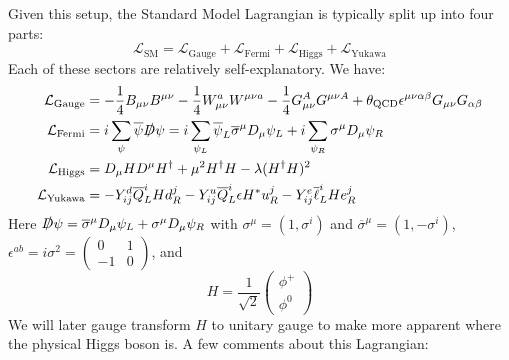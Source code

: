 \documentclass[11pt, oneside]{article}   	%
\theoremstyle{definition}
\numberwithin{equation}{subsection}		%
\begin{document}
Given this setup, the Standard Model Lagrangian is typically split up into four parts:
\begin{equation}
	\mathcal L_\mathrm{SM} = \mathcal{L}_\mathrm{Gauge} + \mathcal{L}_\mathrm{Fermi} + \mathcal{L}_\mathrm{Higgs} + 
	\mathcal{L}_\mathrm{Yukawa}
\end{equation}
Each of these sectors are relatively self-explanatory. We have:
\begin{align}
	\mathcal{L}_\mathrm{Gauge} &= -\frac{1}{4} B_{\mu\nu} B^{\mu\nu} - \frac{1}{4} W_{\mu\nu}^a W^{\mu\nu a} - \frac{1}{4} 
	G_{\mu\nu}^A G^{\mu\nu A} + \theta_\mathrm{QCD} \epsilon^{\mu\nu\alpha\beta} G_{\mu\nu} G_{\alpha\beta} \\
	\mathcal{L}_\mathrm{Fermi} &= i\sum_\psi\overline\psi \slashed D \psi = i\sum_{\psi_L} \overline\psi_L 
	\overline\sigma^\mu D_\mu\psi_L + i\sum_{\psi_R} \sigma^\mu D_\mu \psi_R \\
	\mathcal{L}_\mathrm{Higgs} &= D_\mu H D^\mu H^\dagger + \mu^2 H^\dagger H - \lambda (H^\dagger H)^2 \\
	\mathcal{L}_\mathrm{Yukawa} &= - Y_{ij}^d \overline Q_L^i H d_R^j - Y_{ij}^u \overline Q_L^i\epsilon H^* u_R^j - 
	Y_{ij}^e \overline\ell_L^i H e_R^j~\label{eq:yukawa}
\end{align}
Here $\slashed D\psi = \overline\sigma^\mu D_\mu \psi_L + \sigma^\mu D_\mu \psi_R$ with $\sigma^\mu = (1, 
\sigma^i)$ and $\overline\sigma^\mu = (1, -\sigma^i)$, $\epsilon^{ab} = i\sigma^2 = \begin{pmatrix} 0 & 1 \\ -1 & 0 \end{pmatrix}$, 
and 
\begin{equation}
	H = \frac{1}{\sqrt{2}}\begin{pmatrix} \phi^+ \\ \phi^0 \end{pmatrix}
\end{equation}
We will later gauge transform $H$ to unitary gauge to make more apparent where the physical Higgs boson is. A few 
comments about this Lagrangian:
\end{document}
